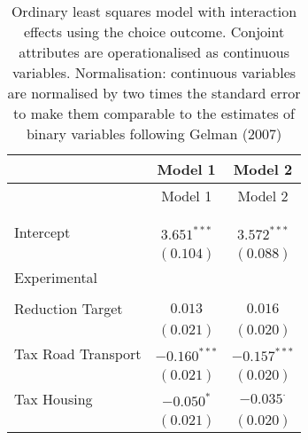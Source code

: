 
\begin{center}
\begin{tiny}
\begin{longtable}{l@{} c@{} c@{}}
\hline
 & Model 1 & Model 2 \\
\hline
\endfirsthead
\hline
 & Model 1 & Model 2 \\
\hline
\endhead
\hline
\endfoot
\hline
\multicolumn{3}{l}{\tiny{$^{***}p<0.001$; $^{**}p<0.01$; $^{*}p<0.05$; $^{\cdot}p<0.1$}}\\
\caption{Ordinary least squares model with interaction effects using the choice outcome. Conjoint attributes are operationalised as continuous variables. Normalisation: continuous variables are normalised by two times
               the standard error to make them comparable to the estimates of binary variables following Gelman (2007)}
\label{table:linear_interactions_benefit_EV_left_right_sal}
\endlastfoot \\
Intercept                                                                                  & $3.651^{***}$    & $3.572^{***}$    \\
                                                                                           & $(0.104)$        & $(0.088)$        \\
Experimental                                                                               &                  &                  \\
                                                                                           &                  &                  \\
\quad Reduction Target                                                                     & $0.013$          & $0.016$          \\
                                                                                           & $(0.021)$        & $(0.020)$        \\
\quad Tax Road Transport                                                                   & $-0.160^{***}$   & $-0.157^{***}$   \\
                                                                                           & $(0.021)$        & $(0.020)$        \\
\quad Tax Housing                                                                          & $-0.050^{*}$     & $-0.035^{\cdot}$ \\
                                                                                           & $(0.021)$        & $(0.020)$        \\

\end{longtable}
\end{tiny}
\end{center}
